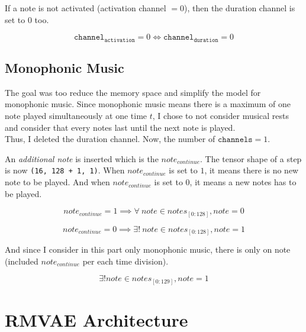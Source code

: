 \documentclass[12pt]{report}
\begin{document}
If a note is not activated (activation channel $ = 0$), then the duration channel is set to $0$ too.

\begin{equation}
    \texttt{channel}_{\texttt{activation}} = 0 \iff \texttt{channel}_{\texttt{duration}} = 0
\end{equation}

\subsection{Monophonic Music}
\label{sec:mono}

The goal was too reduce the memory space and simplify the model for monophonic music.
Since monophonic music means there is a maximum of one note played simultaneously at one time $t$, I chose to not consider musical rests and consider that every notes last until the next note is played.\\
Thus, I deleted the duration channel.
Now, the number of $\texttt{channels} = 1$.

An \textit{additional note} is inserted which is the $note_{continue}$.
The tensor shape of a step is now \texttt{(16, 128 + 1, 1)}.
When $note_{continue}$ is set to $1$, it means there is no new note to be played.
And when $note_{continue}$ is set to $0$, it means a new notes has to be played.

\begin{equation}
    note_{continue} = 1 \implies \forall~ note \in notes_{[0:128]}, note = 0
\end{equation}

\begin{equation}
    note_{continue} = 0 \implies \exists!~ note \in notes_{[0:128]}, note = 1
\end{equation}

And since I consider in this part only monophonic music, there is only on note (included $note_{continue}$ per each time division).

\begin{equation}
    \exists! note \in notes_{[0:129]}, note = 1
\end{equation}


\section{RMVAE Architecture}
\label{sec:rmvae}
\end{document}
